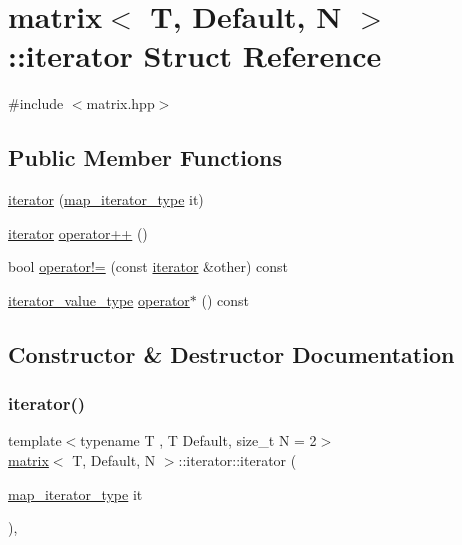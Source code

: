 \hypertarget{structmatrix_1_1iterator}{}\section{matrix$<$ T, Default, N $>$\+:\+:iterator Struct Reference}
\label{structmatrix_1_1iterator}


{\ttfamily \#include $<$matrix.\+hpp$>$}

\subsection*{Public Member Functions}
\begin{DoxyCompactItemize}
\item 
\hyperlink{structmatrix_1_1iterator_a6144220c7418247abc9d45d71687637a}{iterator} (\hyperlink{structmatrix_a73d7dc1f59c66d8fede2107be5ff190d}{map\+\_\+iterator\+\_\+type} it)
\item 
\hyperlink{structmatrix_1_1iterator}{iterator} \hyperlink{structmatrix_1_1iterator_a846675c38c58ac5954911ff9281d6b45}{operator++} ()
\item 
bool \hyperlink{structmatrix_1_1iterator_ad60f23552a67ebdf788a48b865f0e04f}{operator!=} (const \hyperlink{structmatrix_1_1iterator}{iterator} \&other) const
\item 
\hyperlink{structmatrix_a54b3613a5cf2df7a45556b017ebe306f}{iterator\+\_\+value\+\_\+type} \hyperlink{structmatrix_1_1iterator_a3c50e59b2011ffab21b41c94b0de1657}{operator$\ast$} () const
\end{DoxyCompactItemize}


\subsection{Constructor \& Destructor Documentation}
\mbox{\label{structmatrix_1_1iterator_a6144220c7418247abc9d45d71687637a}} 
\subsubsection{\texorpdfstring{iterator()}{iterator()}}
{\footnotesize\ttfamily template$<$typename T , T Default, size\+\_\+t N = 2$>$ \\
\hyperlink{structmatrix}{matrix}$<$ T, Default, N $>$\+::iterator\+::iterator (\begin{DoxyParamCaption}\item[{\hyperlink{structmatrix_a73d7dc1f59c66d8fede2107be5ff190d}{map\+\_\+iterator\+\_\+type}}]{it }\end{DoxyParamCaption})\hspace{0.3cm}{\ttfamily [inline]}, {\ttfamily [explicit]}}



